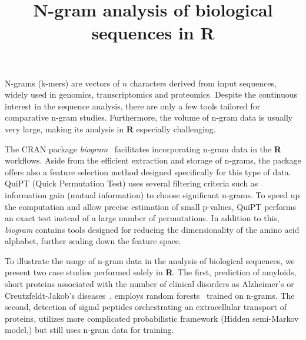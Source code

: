 \documentclass[a4paper,10pt]{article}
\title{N-gram analysis of biological sequences in R}
\author{}
\date{}
\begin{document}
\maketitle

N-grams (k-mers) are vectors of $n$ characters derived from input sequences, 
widely used in genomics, transcriptomics and proteomics. Despite the continuous 
interest in the sequence analysis, there are only a few tools tailored for 
comparative n-gram studies. Furthermore, the volume of n-gram data is usually 
very large, making its analysis in \textbf{R} especially challenging. 

The CRAN package \textit{biogram}~\citep{burdukiewicz_biogram:_2015} facilitates 
incorporating n-gram data in the \textbf{R} workflows. Aside from the efficient 
extraction and storage of n-grams, the package offers also a feature selection 
method designed specifically for this type of data. QuiPT (Quick Permutation 
Test) uses several filtering criteria such as information gain (mutual 
information) to choose significant n-grams. To speed up the computation and 
allow precise estimation of small p-values, QuiPT performs an exact test instead 
of a large number of permutations. In addition to this, \textit{biogram} 
contains tools designed for reducing the dimensionality of the amino acid 
alphabet\citep{murphy_simplified_2000}, further scaling down the feature space.

To illustrate the usage of n-gram data in the analysis of biological sequences,  
we present two case studies performed solely in \textbf{R}. The first,   
prediction of amyloids, short proteins associated with the number of clinical   
disorders as Alzheimer's or Creutzfeldt-Jakob’s 
diseases~\citep{fandrich_oligomeric_2012}, employs random 
forests~\citep{wright_ranger:_2015} trained on n-grams. The second, detection   
of signal peptides orchestrating an extracellular transport of proteins, 
utilizes more complicated probabilistic framework (Hidden semi-Markov 
model,) but still uses n-gram data for training. 


\end{document}

